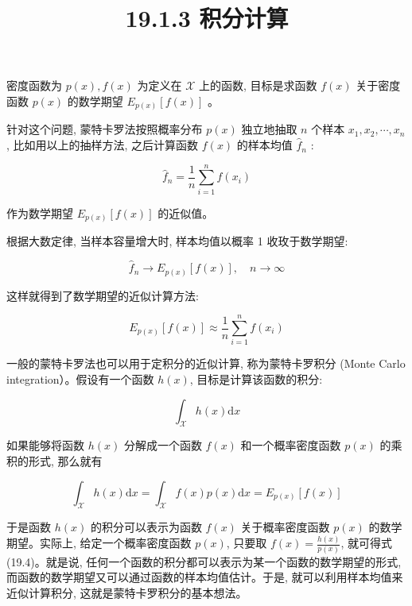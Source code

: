 \documentclass[10pt]{article}
\title{19.1.3 积分计算 }
\author{}
\date{}
\begin{document}
\begin{CJK*}{UTF8}{bsmi}
\maketitle
密度函数为 $p(x), f(x)$ 为定义在 $\mathcal{X}$ 上的函数, 目标是求函数 $f(x)$ 关于密度函数 $p(x)$ 的数学期望 $E_{p(x)}[f(x)]$ 。

针对这个问题, 蒙特卡罗法按照概率分布 $p(x)$ 独立地抽取 $n$ 个样本 $x_{1}, x_{2}, \cdots, x_{n}$, 比如用以上的抽样方法, 之后计算函数 $f(x)$ 的样本均值 $\hat{f}_{n}$ :


\begin{equation*}
\hat{f}_{n}=\frac{1}{n} \sum_{i=1}^{n} f\left(x_{i}\right) \tag{19.1}
\end{equation*}


作为数学期望 $E_{p(x)}[f(x)]$ 的近似值。

根据大数定律, 当样本容量增大时, 样本均值以概率 1 收玫于数学期望:


\begin{equation*}
\hat{f}_{n} \rightarrow E_{p(x)}[f(x)], \quad n \rightarrow \infty \tag{19.2}
\end{equation*}


这样就得到了数学期望的近似计算方法:


\begin{equation*}
E_{p(x)}[f(x)] \approx \frac{1}{n} \sum_{i=1}^{n} f\left(x_{i}\right) \tag{19.3}
\end{equation*}


一般的蒙特卡罗法也可以用于定积分的近似计算, 称为蒙特卡罗积分 (Monte Carlo integration）。假设有一个函数 $h(x)$, 目标是计算该函数的积分:

$$
\int_{\mathcal{X}} h(x) \mathrm{d} x
$$

如果能够将函数 $h(x)$ 分解成一个函数 $f(x)$ 和一个概率密度函数 $p(x)$ 的乘积的形式, 那么就有


\begin{equation*}
\int_{\mathcal{X}} h(x) \mathrm{d} x=\int_{\mathcal{X}} f(x) p(x) \mathrm{d} x=E_{p(x)}[f(x)] \tag{19.4}
\end{equation*}


于是函数 $h(x)$ 的积分可以表示为函数 $f(x)$ 关于概率密度函数 $p(x)$ 的数学期望。实际上, 给定一个概率密度函数 $p(x)$, 只要取 $f(x)=\frac{h(x)}{p(x)}$, 就可得式 (19.4)。就是说, 任何一个函数的积分都可以表示为某一个函数的数学期望的形式, 而函数的数学期望又可以通过函数的样本均值估计。于是, 就可以利用样本均值来近似计算积分, 这就是蒙特卡罗积分的基本想法。



\end{CJK*}
\end{document}
